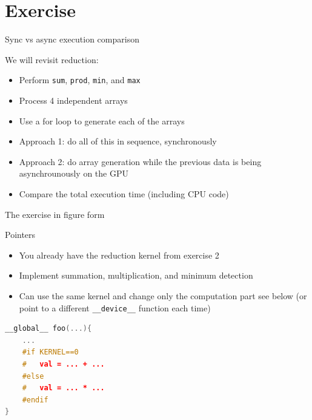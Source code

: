 \documentclass[11pt,t]{beamer}
\newcommand{\inline}[1]{ \colorbox{mygray}{\lstinline{#1}}}
\begin{document}
\section{Exercise}

\begin{frame}{Sync vs async execution comparison}

We will revisit reduction:
\vspace{0.25em}
\begin{itemize}\setlength\itemsep{0.5em}
    \item Perform \inline{sum}, \inline{prod}, \inline{min}, and \inline{max}
    \item Process 4 independent arrays
    \item Use a for loop to generate each of the arrays
    \item Approach 1: do all of this in sequence, synchronously
    \item Approach 2: do array generation while the previous data is being asynchrounously on the GPU
    \item Compare the total execution time (including CPU code)
\end{itemize}

\end{frame}


\begin{frame}{The exercise in figure form}

\begin{figure}
    \centering
    
\end{figure}

\end{frame}


\begin{frame}[fragile]{Pointers}

\begin{itemize}\setlength\itemsep{0.75em}
    \item You already have the reduction kernel from exercise 2
    \item Implement summation, multiplication, and minimum detection
    \item Can use the same kernel and change only the computation part see below (or point to a different \inline{__device__} function each time)
\end{itemize}
\vspace{0.5em}

\begin{lstlisting}[language=C++]
__global__ foo(...){
    ...
    #if KERNEL==0
    #   val = ... + ...
    #else
    #   val = ... * ...
    #endif
}
\end{lstlisting}

\end{frame}
\end{document}

